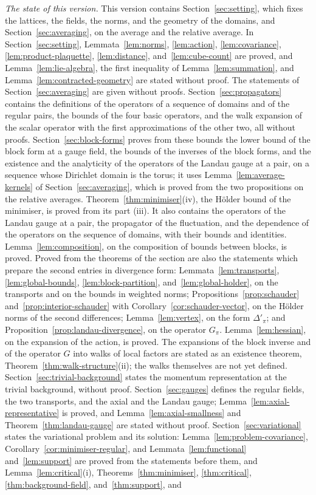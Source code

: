 \documentclass[11pt]{preprint}
\numberwithin{equation}{section}
\begin{document}
\emph{The state of this version.} This version contains Section~\ref{sec:setting}, which fixes the lattices, the fields, the norms, and the geometry of the domains, and Section~\ref{sec:averaging}, on the average and the relative average. In Section~\ref{sec:setting}, Lemmata~\ref{lem:norms}, \ref{lem:action}, \ref{lem:covariance}, \ref{lem:product-plaquette}, \ref{lem:distance}, and~\ref{lem:cube-count} are proved, and Lemma~\ref{lem:lie-algebra}, the first inequality of Lemma~\ref{lem:summation}, and Lemma~\ref{lem:contracted-geometry} are stated without proof. The statements of Section~\ref{sec:averaging} are given without proofs. Section~\ref{sec:propagators} contains the definitions of the operators of a sequence of domains and of the regular pairs, the bounds of the four basic operators, and the walk expansion of the scalar operator with the first approximations of the other two, all without proofs. Section~\ref{sec:block-forms} proves from these bounds the lower bound of the block form at a gauge field, the bounds of the inverses of the block forms, and the existence and the analyticity of the operators of the Landau gauge at a pair, on a sequence whose Dirichlet domain is the torus; it uses Lemma~\ref{lem:average-kernels} of Section~\ref{sec:averaging}, which is proved from the two propositions on the relative averages. Theorem~\ref{thm:minimiser}(iv), the H\"older bound of the minimiser, is proved from its part (iii). It also contains the operators of the Landau gauge at a pair, the propagator of the fluctuation, and the dependence of the operators on the sequence of domains, with their bounds and identities. Lemma~\ref{lem:composition}, on the composition of bounds between blocks, is proved. Proved from the theorems of the section are also the statements which prepare the second entries in divergence form: Lemmata~\ref{lem:transports}, \ref{lem:global-bounds}, \ref{lem:block-partition}, and~\ref{lem:global-holder}, on the transports and on the bounds in weighted norms; Propositions~\ref{prop:schauder} and~\ref{prop:interior-schauder} with Corollary~\ref{cor:schauder-vector}, on the H\"older norms of the second differences; Lemma~\ref{lem:vertex}, on the form $\Delta'_\pi$; and Proposition~\ref{prop:landau-divergence}, on the operator $G_\pi$. Lemma~\ref{lem:hessian}, on the expansion of the action, is proved. The expansions of the block inverse and of the operator $G$ into walks of local factors are stated as an existence theorem, Theorem~\ref{thm:walk-structure}(ii); the walks themselves are not yet defined. Section~\ref{sec:trivial-background} states the momentum representation at the trivial background, without proof. Section~\ref{sec:gauges} defines the regular fields, the two transports, and the axial and the Landau gauge; Lemma~\ref{lem:axial-representative} is proved, and Lemma~\ref{lem:axial-smallness} and Theorem~\ref{thm:landau-gauge} are stated without proof. Section~\ref{sec:variational} states the variational problem and its solution: Lemma~\ref{lem:problem-covariance}, Corollary~\ref{cor:minimiser-regular}, and Lemmata~\ref{lem:functional} and~\ref{lem:support} are proved from the statements before them, and Lemma~\ref{lem:critical}(i), Theorems~\ref{thm:minimiser}, \ref{thm:critical}, \ref{thm:background-field}, and~\ref{thm:support}, and 
\end{document}
